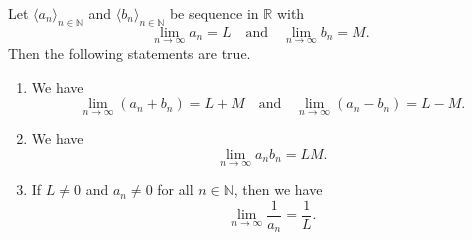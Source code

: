 \begin{theorem}
  Let $\langle a_n \rangle_{n \in \mathbb{N}}$ and
  $\langle b_n \rangle_{n \in \mathbb{N}}$ be sequence in $\mathbb{R}$ with
  \begin{equation*}
    \lim_{n \to \infty} a_n = L
    \quad \text{and} \quad
    \lim_{n \to \infty} b_n = M.
  \end{equation*}
  Then the following statements are true.
  \begin{enumerate}
    \item We have
    \begin{equation*}
      \lim_{n \to \infty} (a_n + b_n) = L + M
      \quad \text{and} \quad
      \lim_{n \to \infty} (a_n - b_n) = L - M.
    \end{equation*}
    \item We have
    \begin{equation*}
      \lim_{n \to \infty} a_nb_n = LM.
    \end{equation*}
    \item If $L \neq 0$ and $a_n \neq 0$ for all $n \in \mathbb{N}$, then we
    have
    \begin{equation*}
      \lim_{n \to \infty} \frac{1}{a_n} = \frac{1}{L}. 
    \end{equation*}
  \end{enumerate}
\end{theorem}

